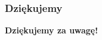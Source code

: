 \documentclass{beamer}
\begin{document}
\begin{frame}\frametitle{Dziękujemy}
\begin{center}
  \Huge{\textbf{Dziękujemy za uwagę!}}
\end{center}
\end{frame}
\end{document}
